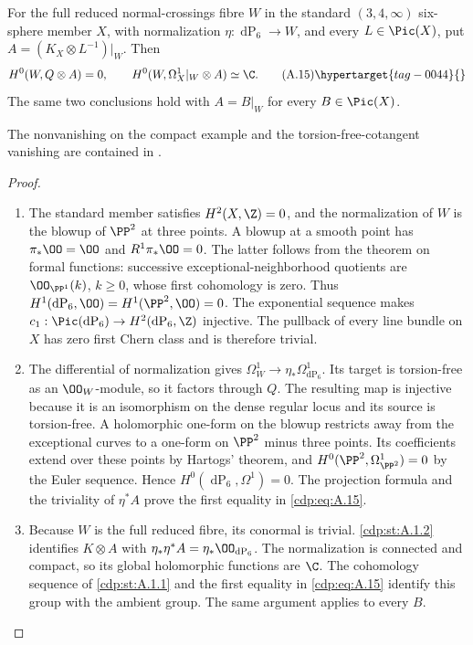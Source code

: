 \begin{proposition}\hypertarget{tag-01AQ}{}\label{cdp:st:A.4.1}

For the full reduced normal-crossings fibre $W$ in the standard $(3,4,\infty)$ six-sphere member $X$, with normalization $\eta:\operatorname{dP}_6\to W$, and every $L\in\Pic(X)$, put $A=(K_X\otimes L^{-1})|_W$. Then
\[
H^0(W,Q\otimes A)=0,
\qquad H^0(W,\Omega_X^1|_W\otimes A)\simeq\C.
\tag{A.15}\hypertarget{tag-0044}{}\label{cdp:eq:A.15}
\]
The same two conclusions hold with $A=B|_W$ for every $B\in\Pic(X)$.
\end{proposition}



The nonvanishing on the compact example and the torsion-free-cotangent vanishing are contained in \citet[Theorem~10.5 and Section~10.4]{AC2026}.

\begin{proof}

\begin{enumerate}[label=\arabic*.,leftmargin=*]
\item The standard member satisfies $H^2(X,\Z)=0$, and the normalization of $W$ is the blowup of $\PP^2$ at three points. A blowup at a smooth point has $\pi_*\OO=\OO$ and $R^1\pi_*\OO=0$. The latter follows from the theorem on formal functions: successive exceptional-neighborhood quotients are $\OO_{\PP^1}(k)$, $k\ge0$, whose first cohomology is zero. Thus $H^1(\operatorname{dP}_6,\OO)=H^1(\PP^2,\OO)=0$. The exponential sequence makes $c_1:\Pic(\operatorname{dP}_6)\to H^2(\operatorname{dP}_6,\Z)$ injective. The pullback of every line bundle on $X$ has zero first Chern class and is therefore trivial.

\item The differential of normalization gives $\Omega_W^1\to\eta_*\Omega^1_{\operatorname{dP}_6}$. Its target is torsion-free as an $\OO_W$-module, so it factors through $Q$. The resulting map is injective because it is an isomorphism on the dense regular locus and its source is torsion-free. A holomorphic one-form on the blowup restricts away from the exceptional curves to a one-form on $\PP^2$ minus three points. Its coefficients extend over these points by Hartogs' theorem, and $H^0(\PP^2,\Omega^1_{\PP^2})=0$ by the Euler sequence. Hence $H^0(\operatorname{dP}_6,\Omega^1)=0$. The projection formula and the triviality of $\eta^*A$ prove the first equality in \eqref{cdp:eq:A.15}.

\item Because $W$ is the full reduced fibre, its conormal is trivial. \ref{cdp:st:A.1.2} identifies $K\otimes A$ with $\eta_*\eta^*A=\eta_*\OO_{\operatorname{dP}_6}$. The normalization is connected and compact, so its global holomorphic functions are $\C$. The cohomology sequence of \ref{cdp:st:A.1.1} and the first equality in \eqref{cdp:eq:A.15} identify this group with the ambient group. The same argument applies to every $B$.

\end{enumerate}
\end{proof}
